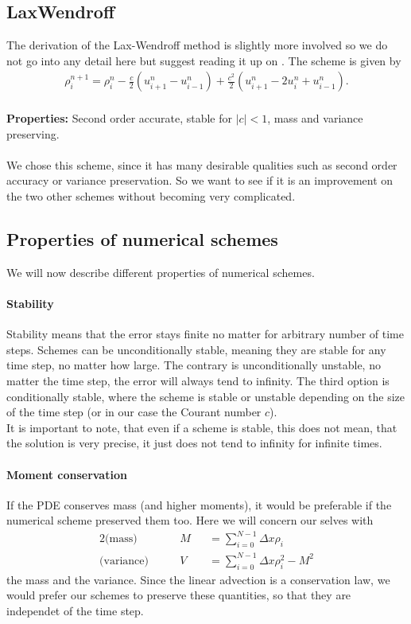 \subsection{LaxWendroff}
The derivation of the Lax-Wendroff method is slightly more involved so we do not go into any detail here but suggest reading it up on \cite[p.127 f.]{lax_book}. The scheme is given by
\begin{align}
\rho_i^{n+1}=\rho_i^n - \frac c2 \left(u^n_{i+1}-u^n_{i-1}\right) +\frac{c^2}{2}\left(u_{i+1}^n-2u_i^n+u_{i-1}^n\right).
\end{align}
\\
\textbf{Properties:} Second order accurate, stable for $|c|<1$, mass and variance preserving.\cite[p.127]{lax_book} \\ \\
We chose this scheme, since it has many desirable qualities such as second order accuracy or variance preservation. So we want to see if it is an improvement on the two other schemes without becoming very complicated. 
\subsection{Properties of numerical schemes}
We will now describe different properties of numerical schemes.
\paragraph{Stability}
Stability means that the error stays finite no matter for arbitrary number of time steps. Schemes can be unconditionally stable, meaning they are stable for any time step, no matter how large. The contrary is unconditionally unstable, no matter the time step, the error will always tend to infinity. The third option is conditionally stable, where the scheme is stable or unstable depending on the size of the time step (or in our case the Courant number $c$).\\
It is important to note, that even if a scheme is stable, this does not mean, that the solution is very precise, it just does not tend to infinity for infinite times. 
\paragraph{Moment conservation}
If the PDE conserves mass (and higher moments), it would be preferable if the numerical scheme preserved them too. Here we will concern our selves with 
\begin{alignat}{2}
\text{(mass)}& \qquad M&&=\sum_{i=0}^{N-1} \Delta x\rho_i \\
\text{(variance)}&\qquad V&&=\sum_{i=0}^{N-1} \Delta x\rho_i ^2- M^2
\end{alignat}
the mass and the variance. Since the linear advection is a conservation law, we would prefer our schemes to preserve these quantities, so that they are independet of the time step.
